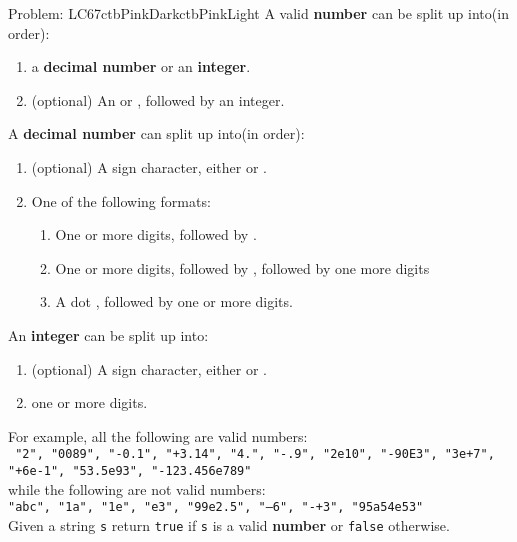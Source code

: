 \documentclass[12pt]{simple_doc}
\begin{document}
    \begin{cbstripe}{Problem: LC67}{ctbPinkDark}{ctbPinkLight}
        A valid \textbf{number} can be split up into(in order):
        \begin{enumerate}
            \item a \textbf{decimal number} or an \textbf{integer}.
            \item (optional) An  or , followed by an integer.
        \end{enumerate}
        A \textbf{decimal number} can split up into(in order):
        \begin{enumerate}
            \item (optional) A sign character, either \monoquote{+} or \monoquote{-}.
            \item One of the following formats:
                \begin{enumerate}
                    \item One or more digits, followed by .
                    \item One or more digits, followed by , followed by one more digits
                    \item A dot , followed by one or more digits.
                \end{enumerate}
        \end{enumerate}
        An \textbf{integer} can be split up into:
        \begin{enumerate}
            \item (optional) A sign character, either \monoquote{+} or \monoquote{-}.
            \item one or more digits.
        \end{enumerate}
        For example, all the following are valid numbers:\medskip \\
        \texttt{
            \hspace*{1em} "2", "0089", "-0.1", "+3.14", "4.", "-.9", "2e10", "-90E3", "3e+7",\\
            \hspace*{1em} "+6e-1", "53.5e93", "-123.456e789"} \medskip \\
        while the following are not valid numbers: \medskip\\
        \hspace*{1em} \texttt{"abc", "1a", "1e", "e3", "99e2.5", "--6", "-+3", "95a54e53"} \medskip \\
        Given a string \texttt{s} return \texttt{true} if \texttt{s} is a valid \textbf{number} or
        \texttt{false} otherwise.


\end{cbstripe}
\end{document}
